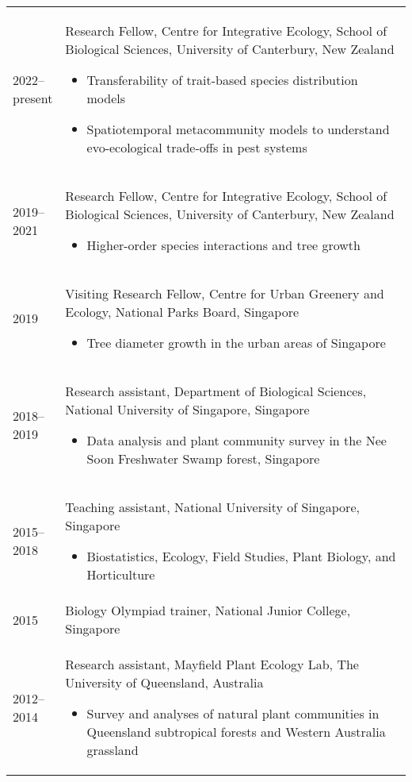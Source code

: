 \documentclass[a4paper]{article}
\begin{document}
\begin{tabular}{p{0.13\linewidth} p{0.87\linewidth}}

2022--present & Research Fellow, Centre for Integrative Ecology, School of Biological Sciences, University of Canterbury, New Zealand
\begin{itemize} 
\item Transferability of trait-based species distribution models
\item Spatiotemporal metacommunity models to understand evo-ecological trade-offs in pest systems
\end{itemize} \\

2019--2021 & Research Fellow, Centre for Integrative Ecology, School of Biological Sciences, University of Canterbury, New Zealand
\begin{itemize} 
\item Higher-order species interactions and tree growth
\end{itemize} \\

2019 & Visiting Research Fellow, Centre for Urban Greenery and Ecology, National Parks Board, Singapore
\begin{itemize} 
\item Tree diameter growth in the urban areas of Singapore
\end{itemize} \\

2018--2019 & Research assistant, Department of Biological Sciences, National University of Singapore, Singapore
\begin{itemize} 
\item Data analysis and plant community survey in the Nee Soon Freshwater Swamp forest, Singapore
\end{itemize} \\

2015--2018 & Teaching assistant, National University of Singapore, Singapore
\begin{itemize} 
\item Biostatistics, Ecology, Field Studies, Plant Biology, and Horticulture
\end{itemize} \\

2015 & Biology Olympiad trainer, National Junior College, Singapore \\

2012--2014 & Research assistant, Mayfield Plant Ecology Lab, The University of Queensland, Australia 
\begin{itemize}
\item Survey and analyses of natural plant communities in Queensland subtropical forests and Western Australia grassland 
\end{itemize} \\


\end{tabular}
\end{document}
